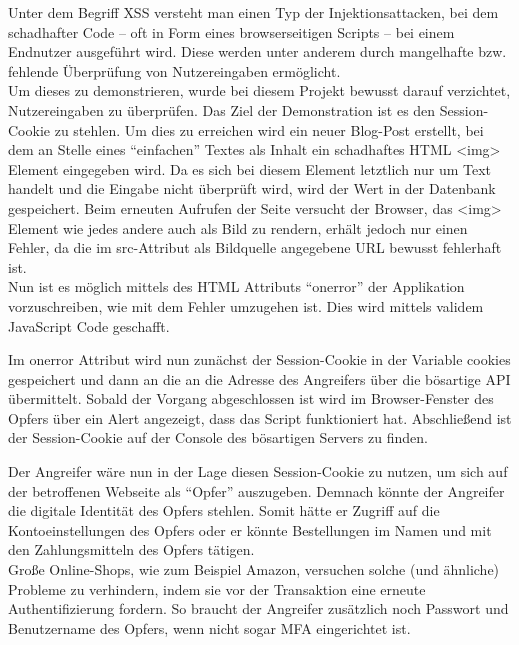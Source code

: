 Unter dem Begriff \ac{XSS} versteht man einen Typ der Injektionsattacken, bei dem schadhafter Code – oft in Form eines browserseitigen Scripts – bei einem Endnutzer ausgeführt wird. Diese werden unter anderem durch mangelhafte bzw. fehlende Überprüfung von Nutzereingaben ermöglicht. \\
Um dieses zu demonstrieren, wurde bei diesem Projekt bewusst darauf verzichtet, Nutzereingaben zu überprüfen. 
Das Ziel der Demonstration ist es den Session-Cookie zu stehlen. Um dies zu erreichen wird ein neuer Blog-Post erstellt, bei dem an Stelle eines ``einfachen'' Textes als Inhalt ein schadhaftes HTML <img> Element eingegeben wird. Da es sich bei diesem Element letztlich nur um Text handelt und die Eingabe nicht überprüft wird, wird der Wert in der Datenbank gespeichert. Beim erneuten Aufrufen der Seite versucht der Browser, das <img> Element wie jedes andere auch als Bild zu rendern, erhält jedoch nur einen Fehler, da die im src-Attribut als Bildquelle angegebene URL bewusst fehlerhaft ist. \\
Nun ist es möglich mittels des HTML Attributs ``onerror'' der Applikation vorzuschreiben, wie mit dem Fehler umzugehen ist. Dies wird mittels validem JavaScript Code geschafft. 

    

Im onerror Attribut wird nun zunächst der Session-Cookie in der Variable cookies gespeichert und dann an die an die Adresse des Angreifers über die bösartige API übermittelt. Sobald der Vorgang abgeschlossen ist wird im Browser-Fenster des Opfers über ein Alert angezeigt, dass das Script funktioniert hat. Abschließend ist der Session-Cookie auf der Console des bösartigen Servers zu finden.

Der Angreifer wäre nun in der Lage diesen Session-Cookie zu nutzen, um sich auf der betroffenen Webseite als ``Opfer'' auszugeben. Demnach könnte der Angreifer die digitale Identität des Opfers stehlen. 
Somit hätte er Zugriff auf die Kontoeinstellungen des Opfers oder er könnte Bestellungen im Namen und mit den Zahlungsmitteln des Opfers tätigen. \\
Große Online-Shops, wie zum Beispiel Amazon, versuchen solche (und ähnliche) Probleme zu verhindern, indem sie vor der Transaktion eine erneute Authentifizierung fordern. So braucht der Angreifer zusätzlich noch Passwort und Benutzername des Opfers, wenn nicht sogar MFA eingerichtet ist.

